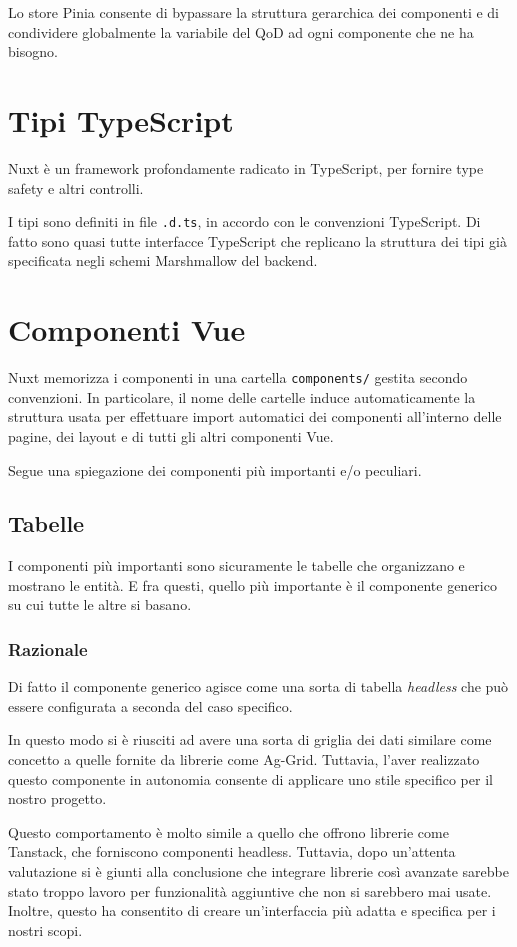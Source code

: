 Lo store Pinia consente di bypassare la struttura gerarchica dei componenti e di condividere globalmente la variabile del QoD ad ogni componente che ne ha bisogno.

\section{Tipi TypeScript}
Nuxt è un framework profondamente radicato in TypeScript, per fornire type safety e altri controlli.

I tipi sono definiti in file \texttt{.d.ts}, in accordo con le convenzioni TypeScript. Di fatto sono quasi tutte interfacce TypeScript che replicano la struttura dei tipi già specificata negli schemi Marshmallow del backend.

\section{Componenti Vue}
Nuxt memorizza i componenti in una cartella \texttt{components/} gestita secondo convenzioni. In particolare, il nome delle cartelle induce automaticamente la struttura usata per effettuare import automatici dei componenti all'interno delle pagine, dei layout e di tutti gli altri componenti Vue.

Segue una spiegazione dei componenti più importanti e/o peculiari.

\subsection{Tabelle}
I componenti più importanti sono sicuramente le tabelle che organizzano e mostrano le entità. E fra questi, quello più importante è il componente generico su cui tutte le altre si basano.

\subsubsection{Razionale}
Di fatto il componente generico agisce come una sorta di tabella \emph{headless} che può essere configurata a seconda del caso specifico.

In questo modo si è riusciti ad avere una sorta di griglia dei dati similare come concetto a quelle fornite da librerie come Ag-Grid. Tuttavia, l'aver realizzato questo componente in autonomia consente di applicare uno stile specifico per il nostro progetto.

Questo comportamento è molto simile a quello che offrono librerie come Tanstack, che forniscono componenti headless. Tuttavia, dopo un'attenta valutazione si è giunti alla conclusione che integrare librerie così avanzate sarebbe stato troppo lavoro per funzionalità aggiuntive che non si sarebbero mai usate. Inoltre, questo ha consentito di creare un'interfaccia più adatta e specifica per i nostri scopi.

